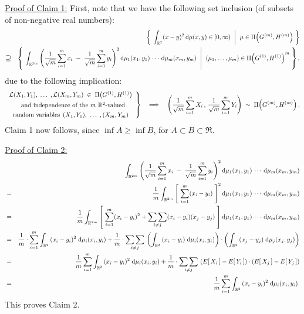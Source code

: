 \mbox{}
\vskip 4cm
\noindent
\underline{Proof of Claim 1:}
\vskip 0.2cm
\noindent
First, note that we have the following set inclusion (of subsets of non-negative real numbers):
\begin{eqnarray*}
&&
	\left\{\; \left. \int_{\mathbb{R}^{2}}(x - y)^{2}\,\textnormal{d}\mu(x,y) \in [0,\infty) \;\;\right\vert\;\, \mu \in \Pi\!\left(G^{(m)},H^{(m)}\right) \;\right\}
\\
&\textnormal{\large$\supseteq$}&
	\left\{\; \left.
	\int_{\mathbb{R}^{2m}}\left(\dfrac{1}{\sqrt{m}}\sum_{i=1}^{m}x_{i} \;-\; \dfrac{1}{\sqrt{m}}\sum_{i=1}^{m}y_{i}\right)^{2}
	\textnormal{d}\mu_{1}(x_{1},y_{1})\,\cdots\,\textnormal{d}\mu_{m}(x_{m},y_{m})
	\;\;\right\vert\;\,
	(\mu_{1},\ldots,\mu_{m}) \in \Pi\!\left(G^{(1)},H^{(1)}\right)^{m}
	\;\right\},
\end{eqnarray*}
due to the following implication:
\begin{equation*}
\left.
\begin{array}{c}
	\mathcal{L}(X_{1},Y_{1}), \;\ldots\;, \mathcal{L}(X_{m},Y_{m}) \;\in\; \Pi\!\left(G^{(1)},H^{(1)}\right)
	\\
	{\color{white}\dfrac{1}{1}}\textnormal{and independence of the $m$ $\Re^{2}$-valued}
	\\
	\textnormal{random variables}\;\,(X_{1},Y_{1}), \;\ldots\;, (X_{m},Y_{m})
\end{array}
\right\}
\quad\Longrightarrow\quad
\left(\dfrac{1}{\sqrt{m}}\sum_{i=1}^{m}X_{i}\,,\,\dfrac{1}{\sqrt{m}}\sum_{i=1}^{m}Y_{i}\right) \;\sim\; \Pi\!\left(G^{(m)},H^{(m)}\right).
\end{equation*}
Claim 1 now follows, since $\inf A \geq \inf B$, for $A \subset B \subset \Re$.


\vskip 0.8cm
\noindent
\underline{Proof of Claim 2:}
\begin{eqnarray*}
&&
	\int_{\mathbb{R}^{2m}}\left(\dfrac{1}{\sqrt{m}}\sum_{i=1}^{m}x_{i} \;-\; \dfrac{1}{\sqrt{m}}\sum_{i=1}^{m}y_{i}\right)^{2}
	\textnormal{d}\mu_{1}(x_{1},y_{1})\,\cdots\,\textnormal{d}\mu_{m}(x_{m},y_{m})
\\
&=&
	\dfrac{1}{m}\int_{\mathbb{R}^{2m}}\left[\;\sum_{i=1}^{m}(x_{i}-y_{i})\;\right]^{2}
	\textnormal{d}\mu_{1}(x_{1},y_{1})\,\cdots\,\textnormal{d}\mu_{m}(x_{m},y_{m})
\\
&=&
	\dfrac{1}{m}\int_{\mathbb{R}^{2m}}\left[\;\sum_{i=1}^{m}(x_{i}-y_{i})^{2} + \underset{i \neq j}{\sum\sum}(x_{i}-y_{i})(x_{j}-y_{j})\;\right]
	\textnormal{d}\mu_{1}(x_{1},y_{1})\,\cdots\,\textnormal{d}\mu_{m}(x_{m},y_{m})
\\
&=&
	\dfrac{1}{m}\cdot\sum_{i=1}^{m}\int_{\mathbb{R}^{2}}\,(x_{i}-y_{i})^{2}\;\textnormal{d}\mu_{i}(x_{i},y_{i})
	+
	\dfrac{1}{m}\cdot\underset{i \neq j}{\sum\sum}\,
	\left( \int_{\mathbb{R}^{2}}\,(x_{i}-y_{i})\;\textnormal{d}\mu_{i}(x_{i},y_{i}) \right)\cdot
	\left( \int_{\mathbb{R}^{2}}\,(x_{j}-y_{j})\;\textnormal{d}\mu_{j}(x_{j},y_{j}) \right)
\\
&=&
	\dfrac{1}{m}\sum_{i=1}^{m}\int_{\mathbb{R}^{2}}\,(x_{i}-y_{i})^{2}\;\textnormal{d}\mu_{i}(x_{i},y_{i})
	+
	\dfrac{1}{m}\cdot\underset{i \neq j}{\sum\sum}\,
	\left( E\!\left[\,X_{i}\,\right] - E\!\left[\,Y_{i}\,\right] \right)\cdot
	\left( E\!\left[\,X_{j}\,\right] - E\!\left[\,Y_{j}\,\right]  \right)
\\
&=&
	\dfrac{1}{m}\sum_{i=1}^{m}\int_{\mathbb{R}^{2}}\,(x_{i}-y_{i})^{2}\;\textnormal{d}\mu_{i}(x_{i},y_{i}).
\end{eqnarray*}
This proves Claim 2.

